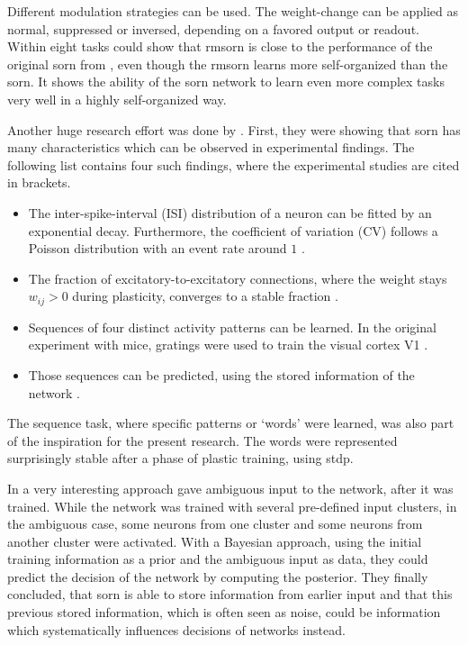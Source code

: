 Different modulation strategies can be used. The weight-change can be applied as normal, suppressed or inversed, depending on a favored output or readout. Within eight tasks \textcite{aswolinskiy2015rm} could show that \acs{rmsorn} is close to the performance of the original \ac{sorn} from \textcite{lazar2009sorn}, even though the \acs{rmsorn} learns more self-organized than the \ac{sorn}. It shows the ability of the \ac{sorn} network to learn even more complex tasks very well in a highly self-organized way.

Another huge research effort was done by \textcite{hartmann2015s}. First, they were showing that \ac{sorn} has many characteristics which can be observed in experimental findings. The following list contains four such findings, where the experimental studies are cited in brackets.

\begin{itemize}
\item The inter-spike-interval (ISI) distribution of a neuron can be fitted by an exponential decay. Furthermore, the coefficient of variation (CV) follows a Poisson distribution with an event rate around $1$ \parencite{kenet2003spontaneously, goris2014partitioning}.
\item The fraction of excitatory-to-excitatory connections, where the weight stays $w_{ij} > 0$ during plasticity, converges to a stable fraction \parencite{yasumatsu2008principles}.
\item Sequences of four distinct activity patterns can be learned. In the original experiment with mice, gratings were used to train the visual cortex V1 \parencite{gavornik2014learned}.
\item Those sequences can be predicted, using the stored information of the network \parencite{gavornik2014learned}.
\end{itemize}

The sequence task, where specific patterns or `words' were learned, was also part of the inspiration for the present research. The words were represented surprisingly stable after a phase of plastic training, using \ac{stdp}.

In a very interesting approach \textcite{hartmann2015s} gave ambiguous input to the network, after it was trained. While the network was trained with several pre-defined input clusters, in the ambiguous case, some neurons from one cluster and some neurons from another cluster were activated. With a Bayesian approach, using the initial training information as a prior and the ambiguous input as data, they could predict the decision of the network by computing the posterior. They finally concluded, that \ac{sorn} is able to store information from earlier input and that this previous stored information, which is often seen as noise, could be information which systematically influences decisions of networks instead.


